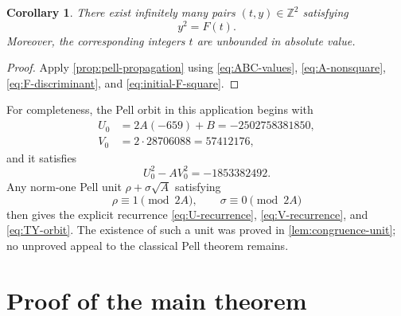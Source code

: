 \documentclass[11pt]{article}
\newtheorem{corollary}[corollary]{Corollary}
\theoremstyle{remark}
\newcommand{\Z}{\mathbb Z}
\begin{document}
\begin{corollary}\label{cor:F-infinitely-many-squares}
There exist infinitely many pairs $(t,y)\in\Z^2$ satisfying
\begin{equation}\label{eq:F-square}
 y^2=F(t).
\end{equation}
Moreover, the corresponding integers $t$ are unbounded in absolute value.
\end{corollary}

\begin{proof}
Apply \cref{prop:pell-propagation} using \eqref{eq:ABC-values}, \eqref{eq:A-nonsquare}, \eqref{eq:F-discriminant}, and \eqref{eq:initial-F-square}.
\end{proof}

For completeness, the Pell orbit in this application begins with
\begin{align*}
 U_0&=2A(-659)+B=-2502758381850,\\
 V_0&=2\cdot28706088=57412176,
\end{align*}
and it satisfies
\[
 U_0^2-AV_0^2=-1853382492.
\]
Any norm-one Pell unit $\rho+\sigma\sqrt A$ satisfying
\[
 \rho\equiv1\pmod{2A},
 \qquad
 \sigma\equiv0\pmod{2A}
\]
then gives the explicit recurrence \eqref{eq:U-recurrence}, \eqref{eq:V-recurrence}, and \eqref{eq:TY-orbit}.  The existence of such a unit was proved in \cref{lem:congruence-unit}; no unproved appeal to the classical Pell theorem remains.

\section{Proof of the main theorem}
\end{document}
